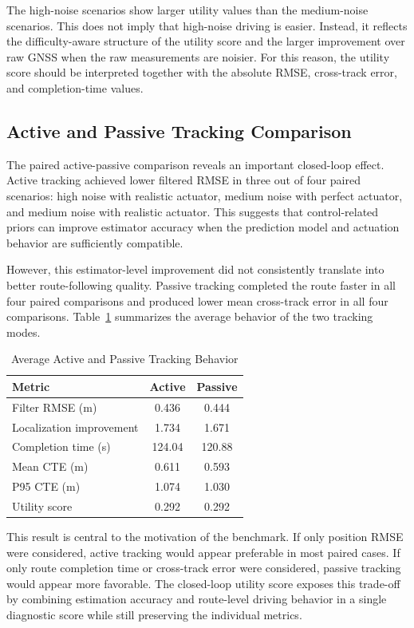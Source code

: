 \documentclass[conference]{IEEEtran}
\begin{document}
The high-noise scenarios show larger utility values than the medium-noise scenarios. This does not imply that high-noise driving is easier. Instead, it reflects the difficulty-aware structure of the utility score and the larger improvement over raw GNSS when the raw measurements are noisier. For this reason, the utility score should be interpreted together with the absolute RMSE, cross-track error, and completion-time values.

\subsection{Active and Passive Tracking Comparison}

The paired active-passive comparison reveals an important closed-loop effect. Active tracking achieved lower filtered RMSE in three out of four paired scenarios: high noise with realistic actuator, medium noise with perfect actuator, and medium noise with realistic actuator. This suggests that control-related priors can improve estimator accuracy when the prediction model and actuation behavior are sufficiently compatible.

However, this estimator-level improvement did not consistently translate into better route-following quality. Passive tracking completed the route faster in all four paired comparisons and produced lower mean cross-track error in all four comparisons. Table~\ref{tab:active_passive} summarizes the average behavior of the two tracking modes.

\begin{table}[!t]
\renewcommand{\arraystretch}{1.15}
\caption{Average Active and Passive Tracking Behavior}
\label{tab:active_passive}
\centering
\begin{tabular}{@{}lcc@{}}
\toprule
Metric & Active & Passive \\
\midrule
Filter RMSE (m) & 0.436 & 0.444 \\
Localization improvement & 1.734 & 1.671 \\
Completion time (s) & 124.04 & 120.88 \\
Mean CTE (m) & 0.611 & 0.593 \\
P95 CTE (m) & 1.074 & 1.030 \\
Utility score & 0.292 & 0.292 \\
\bottomrule
\end{tabular}
\end{table}

This result is central to the motivation of the benchmark. If only position RMSE were considered, active tracking would appear preferable in most paired cases. If only route completion time or cross-track error were considered, passive tracking would appear more favorable. The closed-loop utility score exposes this trade-off by combining estimation accuracy and route-level driving behavior in a single diagnostic score while still preserving the individual metrics.
\end{document}
